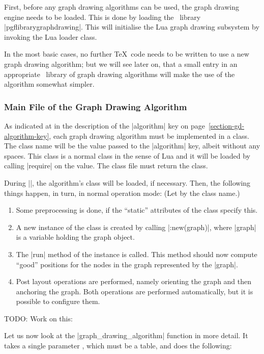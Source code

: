 First, before any graph drawing algorithms can be used, the graph
drawing engine needs to be loaded. This is done by loading the
\pgfname\ library |pgflibrarygraphdrawing|. This will
initialise the Lua graph drawing subsystem by invoking the Lua loader
class.   

In the most basic cases, no further \TeX\ code needs to be written to
use a new graph drawing algorithm; but we will see later on, that a
small entry in an appropriate \pgfname\ library of graph drawing
algorithms will make the use of the algorithm somewhat simpler.


\subsubsection{Main File of the Graph Drawing Algorithm}

As indicated at in the description of the |algorithm| key on
page~\ref{section-gd-algorithm-key}, each graph drawing algorithm  
must be implemented in a class. The class name will be the value
passed to the |algorithm| key, albeit without any spaces. This class
is a normal class in the sense of Lua and it will be loaded by calling
|require| on the value. The class file must return the class.

During |\pgfgdendscope|, the algorithm's class will be loaded, if
necessary. Then, the following things happen, in turn, in normal
operation mode: (Let  by the class name.)

\begin{enumerate}
\item Some preprocessing is done, if the ``static'' attributes of the
  class specify this.
\item A new instance of the class is created by calling
  |:new(graph)|, where |graph| is a variable holding the
  graph object. 
\item The |run| method of the instance is called. This method should now
  compute ``good'' positions for the nodes in the graph represented by
  the |graph|.
\item Post layout operations are performed, namely orienting the
  graph and then anchoring the graph. Both operations are performed
  automatically, but it is possible to configure them.
\end{enumerate}

TODO: Work on this:

Let us now look at the |graph_drawing_algorithm| function in more
detail. It takes a single parameter , which must be a
table, and does the following:

